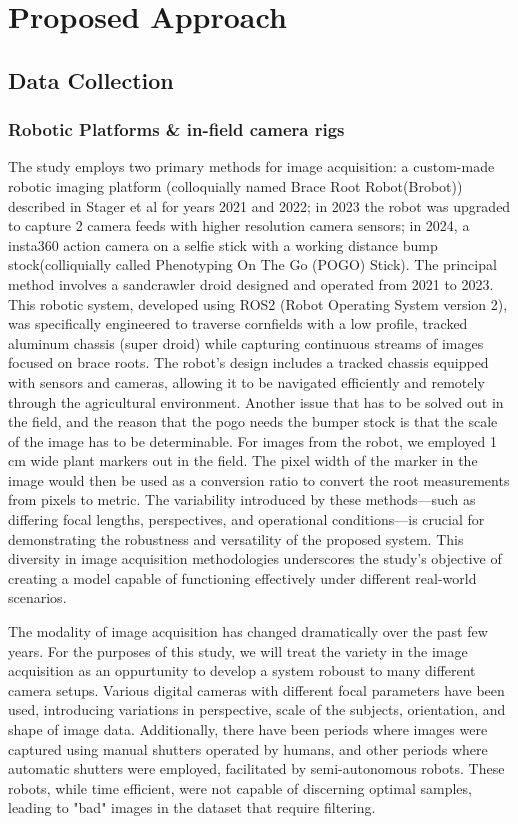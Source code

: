 \chapter{Proposed Approach}
\section{Data Collection}
\subsection{Robotic Platforms \& in-field camera rigs}
The study employs two primary methods for image acquisition: a custom-made robotic imaging platform (colloquially named Brace Root Robot(Brobot)) described in Stager et al for years 2021 and 2022; in 2023 the robot was upgraded to capture 2 camera feeds with higher resolution camera sensors; in 2024, a insta360 action camera on a selfie stick with a working distance bump stock(colliquially called Phenotyping On The Go (POGO) Stick). The principal method involves a sandcrawler droid designed and operated from 2021 to 2023. This robotic system, developed using ROS2 (Robot Operating System version 2), was specifically engineered to traverse cornfields with a low profile, tracked aluminum chassis (super droid) while capturing continuous streams of images focused on brace roots. The robot's design includes a tracked chassis equipped with sensors and cameras, allowing it to be navigated efficiently and remotely through the agricultural environment. 
Another issue that has to be solved out in the field, and the reason that the pogo needs the bumper stock is that the scale of the image has to be determinable. For images from the robot, we employed 1 cm wide plant markers out in the field. The pixel width of the marker in the image would then be used as a conversion ratio to convert the root measurements from pixels to metric.   
The variability introduced by these methods—such as differing focal lengths, perspectives, and operational conditions—is crucial for demonstrating the robustness and versatility of the proposed system. This diversity in image acquisition methodologies underscores the study's objective of creating a model capable of functioning effectively under different real-world scenarios. 

The modality of image acquisition has changed dramatically over the past few years. For the purposes of this study, we will treat the variety in the image acquisition as an oppurtunity to develop a system roboust to many different camera setups. Various digital cameras with different focal parameters have been used, introducing variations in perspective, scale of the subjects, orientation, and shape of image data. Additionally, there have been periods where images were captured using manual shutters operated by humans, and other periods where automatic shutters were employed, facilitated by semi-autonomous robots. These robots, while time efficient, were not capable of discerning optimal samples, leading to "bad" images in the dataset that require filtering.

